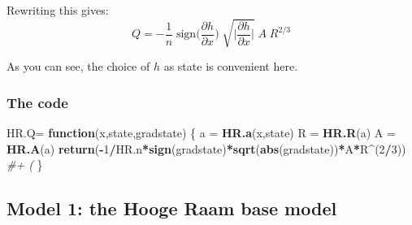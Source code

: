 \documentclass[
]{article}
\newenvironment{Shaded}{\begin{snugshade}}{\end{snugshade}}
\newcommand{\CommentTok}[1]{\textcolor[rgb]{0.56,0.35,0.01}{\textit{#1}}}
\newcommand{\ControlFlowTok}[1]{\textcolor[rgb]{0.13,0.29,0.53}{\textbf{#1}}}
\newcommand{\DecValTok}[1]{\textcolor[rgb]{0.00,0.00,0.81}{#1}}
\newcommand{\FunctionTok}[1]{\textcolor[rgb]{0.13,0.29,0.53}{\textbf{#1}}}
\newcommand{\NormalTok}[1]{#1}
\newcommand{\OtherTok}[1]{\textcolor[rgb]{0.56,0.35,0.01}{#1}}
\newcommand{\SpecialCharTok}[1]{\textcolor[rgb]{0.81,0.36,0.00}{\textbf{#1}}}
\begin{document}
Rewriting this gives:
\[Q  = -\frac{1}{n}\; \mathrm{sign}\Big(\frac{\partial h}{\partial x}\Big)\; \sqrt{ \Big| \frac{\partial h}{\partial x} \Big|}\; A\; R^{2/3}\]

As you can see, the choice of \(h\) as state is convenient here.

\hypertarget{the-code}{%
\subsubsection{The code}\label{the-code}}

\begin{Shaded}
\begin{Highlighting}[]
\NormalTok{HR.Q}\OtherTok{=} \ControlFlowTok{function}\NormalTok{(x,state,gradstate)}
\NormalTok{\{}
\NormalTok{  a }\OtherTok{=} \FunctionTok{HR.a}\NormalTok{(x,state)}
\NormalTok{  R }\OtherTok{=} \FunctionTok{HR.R}\NormalTok{(a)}
\NormalTok{  A }\OtherTok{=} \FunctionTok{HR.A}\NormalTok{(a)}
  \FunctionTok{return}\NormalTok{(}\SpecialCharTok{{-}}\DecValTok{1}\SpecialCharTok{/}\NormalTok{HR.n}\SpecialCharTok{*}\FunctionTok{sign}\NormalTok{(gradstate)}\SpecialCharTok{*}\FunctionTok{sqrt}\NormalTok{(}\FunctionTok{abs}\NormalTok{(gradstate))}\SpecialCharTok{*}\NormalTok{A}\SpecialCharTok{*}\NormalTok{R}\SpecialCharTok{\^{}}\NormalTok{(}\DecValTok{2}\SpecialCharTok{/}\DecValTok{3}\NormalTok{)) }\CommentTok{\#+ (}
\NormalTok{\}}
\end{Highlighting}
\end{Shaded}

\hypertarget{model-1-the-hooge-raam-base-model}{%
\subsection{Model 1: the Hooge Raam base
model}\label{model-1-the-hooge-raam-base-model}}
\end{document}
